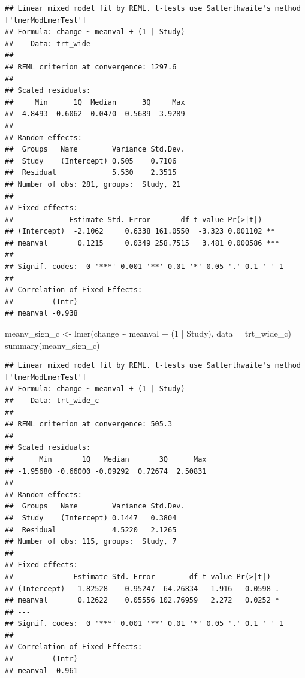 \documentclass[
]{article}
\newenvironment{Shaded}{\begin{snugshade}}{\end{snugshade}}
\newcommand{\AttributeTok}[1]{\textcolor[rgb]{0.77,0.63,0.00}{#1}}
\newcommand{\DecValTok}[1]{\textcolor[rgb]{0.00,0.00,0.81}{#1}}
\newcommand{\FunctionTok}[1]{\textcolor[rgb]{0.00,0.00,0.00}{#1}}
\newcommand{\NormalTok}[1]{#1}
\newcommand{\OtherTok}[1]{\textcolor[rgb]{0.56,0.35,0.01}{#1}}
\newcommand{\SpecialCharTok}[1]{\textcolor[rgb]{0.00,0.00,0.00}{#1}}
\begin{document}
\begin{verbatim}
## Linear mixed model fit by REML. t-tests use Satterthwaite's method ['lmerModLmerTest']
## Formula: change ~ meanval + (1 | Study)
##    Data: trt_wide
## 
## REML criterion at convergence: 1297.6
## 
## Scaled residuals: 
##     Min      1Q  Median      3Q     Max 
## -4.8493 -0.6062  0.0470  0.5689  3.9289 
## 
## Random effects:
##  Groups   Name        Variance Std.Dev.
##  Study    (Intercept) 0.505    0.7106  
##  Residual             5.530    2.3515  
## Number of obs: 281, groups:  Study, 21
## 
## Fixed effects:
##             Estimate Std. Error       df t value Pr(>|t|)    
## (Intercept)  -2.1062     0.6338 161.0550  -3.323 0.001102 ** 
## meanval       0.1215     0.0349 258.7515   3.481 0.000586 ***
## ---
## Signif. codes:  0 '***' 0.001 '**' 0.01 '*' 0.05 '.' 0.1 ' ' 1
## 
## Correlation of Fixed Effects:
##         (Intr)
## meanval -0.938
\end{verbatim}

\begin{Shaded}
\begin{Highlighting}[]
\NormalTok{meanv\_sign\_c }\OtherTok{\textless{}{-}} \FunctionTok{lmer}\NormalTok{(change }\SpecialCharTok{\textasciitilde{}}\NormalTok{ meanval }\SpecialCharTok{+}\NormalTok{ (}\DecValTok{1} \SpecialCharTok{|}\NormalTok{ Study), }\AttributeTok{data =}\NormalTok{ trt\_wide\_c)}
\FunctionTok{summary}\NormalTok{(meanv\_sign\_c)}
\end{Highlighting}
\end{Shaded}

\begin{verbatim}
## Linear mixed model fit by REML. t-tests use Satterthwaite's method ['lmerModLmerTest']
## Formula: change ~ meanval + (1 | Study)
##    Data: trt_wide_c
## 
## REML criterion at convergence: 505.3
## 
## Scaled residuals: 
##      Min       1Q   Median       3Q      Max 
## -1.95680 -0.66000 -0.09292  0.72674  2.50831 
## 
## Random effects:
##  Groups   Name        Variance Std.Dev.
##  Study    (Intercept) 0.1447   0.3804  
##  Residual             4.5220   2.1265  
## Number of obs: 115, groups:  Study, 7
## 
## Fixed effects:
##              Estimate Std. Error        df t value Pr(>|t|)  
## (Intercept)  -1.82528    0.95247  64.26834  -1.916   0.0598 .
## meanval       0.12622    0.05556 102.76959   2.272   0.0252 *
## ---
## Signif. codes:  0 '***' 0.001 '**' 0.01 '*' 0.05 '.' 0.1 ' ' 1
## 
## Correlation of Fixed Effects:
##         (Intr)
## meanval -0.961
\end{verbatim}
\end{document}
